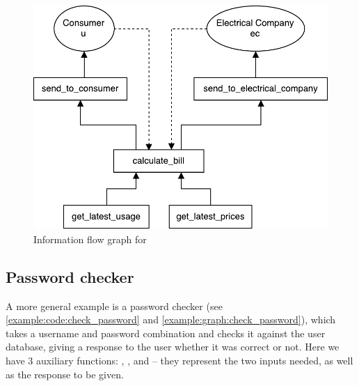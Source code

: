 
\begin{figure}
  \centering
  \includegraphics[scale=0.8]{figures/dlm_calculate_bill}
  \caption{Information flow graph for }
  \label{example:graph:calculate_bill}
\end{figure}

\subsection{Password checker}\label{example:sec:check_password}
A more general example is a password checker (see \cref{example:code:check_password} and \cref{example:graph:check_password}), which takes a username and password combination and checks it against the user database, giving a response to the user whether it was correct or not.
Here we have 3 auxiliary functions: , , and  -- they represent the two inputs needed, as well as the response to be given.

